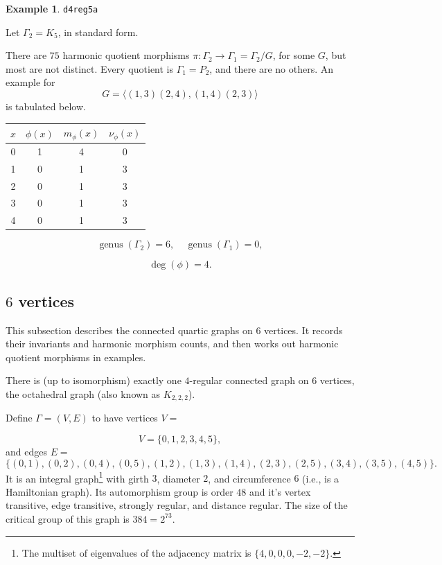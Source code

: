 \documentclass[12pt,letterpaper]{article}
\theoremstyle{definition}
\newtheorem{example}[theorem]{Example}
\DeclareMathOperator{\genus}{genus}
\begin{document}
\begin{example}%
\label{example:d4reg5a}
  {\tt d4reg5a}\newline
{\rm  
  Let $\Gamma_2=K_5$, in standard form.

There are $75$ harmonic quotient morphisms
$\pi: \Gamma_2\to \Gamma_1=\Gamma_2/G$,
for some $G$, but most are not distinct. Every quotient is
$\Gamma_1=P_2$, and there are no others.
An example for
\[
G = \langle (1,3)(2,4), (1,4)(2,3)\rangle
\]
is tabulated below.

\begin{center}
\begin{tabular}{c|c|c|c}  
  $x$ & $\phi(x)$ & $m_\phi(x)$ & $\nu_\phi(x)$ \\ \hline
  0   &    1   &        4         &  0   \\ 
  1   &    0   &        1         &  3  \\ 
  2   &    0   &        1         &  3  \\ 
  3   &    0   &        1         &  3  \\ 
  4   &    0   &        1         &  3   \\ 
\end{tabular}
\end{center}

\[
  \genus(\Gamma_2) =6,\ \ \ \ \
  \genus(\Gamma_1) =0,
\]

\[
\deg(\phi) =4.
\]
}
\end{example}


\subsection{\texorpdfstring{$6$}{6} vertices}

This subsection describes the connected quartic graphs on $6$ vertices.
It records their invariants and harmonic morphism counts, and then
works out harmonic quotient morphisms in examples.


There is (up to isomorphism) exactly one $4$-regular connected graph
on $6$ vertices, the octahedral graph (also known as $K_{2,2,2}$).
\index{octahedral graph}

Define $\Gamma=(V,E)$ to have vertices $V=$

\[
V = \{0,1,2,3,4,5\},
\]
and edges $E=$
\[
\{(0, 1), (0, 2), (0, 4), (0, 5), (1, 2), (1, 3), (1, 4), (2, 3), (2, 5), (3, 4), (3, 5), (4, 5)\}.
\]
It is an integral graph\footnote{The multiset of eigenvalues of
  the adjacency matrix is $\{4, 0, 0, 0, -2, -2\}$.} with girth $3$,
diameter $2$, and circumference $6$ (i.e., is a
Hamiltonian graph).
Its automorphism group is order $48$ and it's vertex transitive,
edge transitive, strongly regular, and distance regular.
The size of the critical group of this graph is $384=2^73$.
\end{document}
